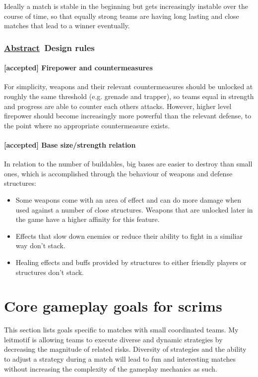 \documentclass{scrartcl}
\newcommand{\abstrac}  [0]{\textbf{\underline{Abstract}\ }}
\newcommand{\accepted} [0]{\textcolor{completed}{\textbf{[accepted] }}}
\begin{document}
Ideally a match is stable in the beginning but gets increasingly instable over the course of time, so that equally strong teams are having long lasting and close matches that lead to a winner eventually.

\subsubsection{\abstrac Design rules}

\paragraph{\accepted Firepower and countermeasures}

For simplicity, weapons and their relevant countermeasures should be unlocked at roughly the same threshold (e.g. grenade and trapper), so teams equal in strength and progress are able to counter each others attacks. However, higher level firepower should become increasingly more powerful than the relevant defense, to the point where no appropriate countermeasure exists.

\paragraph{\accepted Base size/strength relation}

In relation to the number of buildables, big bases are easier to destroy than small ones, which is accomplished through the behaviour of weapons and defense structures:

\begin{itemize}
\item Some weapons come with an area of effect and can do more damage when used against a number of close structures. Weapons that are unlocked later in the game have a higher affinity for this feature.
\item Effects that slow down enemies or reduce their ability to fight in a similiar way don't stack.
\item Healing effects and buffs provided by structures to either friendly players or structures don't stack.
\end{itemize}

\section{Core gameplay goals for scrims}

This section lists goals specific to matches with small coordinated teams. My leitmotif is allowing teams to execute diverse and dynamic strategies by decreasing the magnitude of related risks. Diversity of strategies and the ability to adjust a strategy during a match will lead to fun and interesting matches without increasing the complexity of the gameplay mechanics as such.
\end{document}
